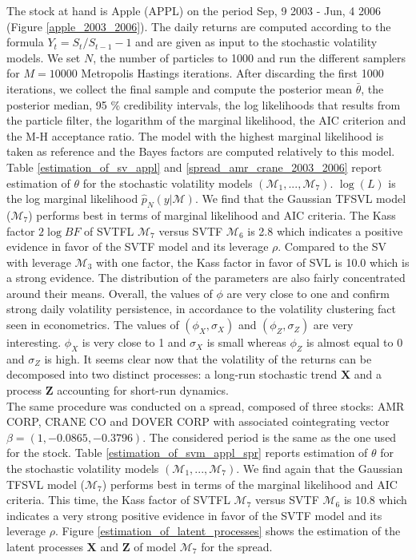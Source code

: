 \documentclass[11pt,a4,twosided,singlespacing,titlepagenumber=on]{scrreprt}
\numberwithin{equation}{chapter} %
\theoremstyle{remark}
\newcommand{\matr}[1]{\mathbf{#1}}
\begin{document}
The stock at hand is Apple (APPL) on the period Sep, 9 2003 - Jun, 4 2006 (Figure \ref{apple_2003_2006}). The daily returns are computed according to the formula $Y_t = S_t / S_{t-1} - 1$ and are given as input to the stochastic volatility models. We set $N$, the number of particles to 1000 and run the different samplers for $M = 10000$ Metropolis Hastings iterations. After discarding the first 1000 iterations, we collect the final sample and compute the posterior mean $\bar{\theta}$, the posterior median, 95 \% credibility intervals, the log likelihoods that results from the particle filter, the logarithm of the marginal likelihood, the AIC criterion and the M-H acceptance ratio. The model with the highest marginal likelihood is taken as reference and the Bayes factors are computed relatively to this model. Table \ref{estimation_of_sv_appl} and \ref{spread_amr_crane_2003_2006} report estimation of $\theta$ for the stochastic volatility models $(\mathcal{M}_1, ..., \mathcal{M}_7)$. $\log (L)$ is the log marginal likelihood $\hat{p}_N(y| \mathcal{M})$. We find that the Gaussian TFSVL model ($\mathcal{M}_7$) performs best in terms of marginal likelihood and AIC criteria. The Kass factor $2 \log BF$ of SVTFL $\mathcal{M}_7$ versus SVTF $\mathcal{M}_6$ is 2.8 which indicates a positive evidence in favor of the SVTF model and its leverage $\rho$. Compared to the SV with leverage $\mathcal{M}_3$ with one factor, the Kass factor in favor of SVL is 10.0 which is a strong evidence. The distribution of the parameters are also fairly concentrated around their means. Overall, the values of $\phi$ are very close to one and confirm strong daily volatility persistence, in accordance to the volatility clustering fact seen in econometrics. The values of $(\phi_X, \sigma_X)$ and $(\phi_Z, \sigma_Z)$ are very interesting. $\phi_X$ is very close to 1 and $\sigma_X$ is small whereas $\phi_Z$ is almost equal to 0 and $\sigma_Z$ is high. It seems clear now that the volatility of the returns can be decomposed into two distinct processes: a long-run stochastic trend $\matr{X}$ and a process $\matr{Z}$ accounting for short-run dynamics. \\

The same procedure was conducted on a spread, composed of three stocks: AMR CORP, CRANE CO and DOVER CORP with associated cointegrating vector $\beta = (1, -0.0865, -0.3796)$. The considered period is the same as the one used for the stock. Table \ref{estimation_of_svm_appl_spr} reports estimation of $\theta$ for the stochastic volatility models $(\mathcal{M}_1, ..., \mathcal{M}_7)$. We find again that the Gaussian TFSVL model ($\mathcal{M}_7$) performs best in terms of the marginal likelihood and AIC criteria. This time, the Kass factor of SVTFL $\mathcal{M}_7$ versus SVTF $\mathcal{M}_6$ is 10.8 which indicates a very strong positive evidence in favor of the SVTF model and its leverage $\rho$. Figure \ref{estimation_of_latent_processes} shows the estimation of the latent processes $\matr{X}$ and $\matr{Z}$ of model $\mathcal{M}_7$ for the spread. 
\end{document}

